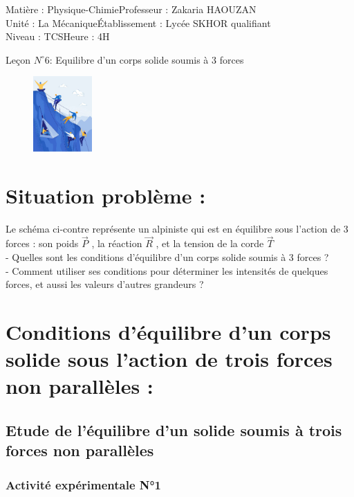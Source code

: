 \documentclass[12pt]{article}
\author{Zakaria HAOUZAN}
\date{\today}
\newcommand\headerMe[2]{\noindent{}#1\hfill#2}
\begin{document}
\headerMe{Matière : Physique-Chimie}{Professeur : Zakaria HAOUZAN}\\
\headerMe{Unité : La Mécanique}{Établissement : Lycée SKHOR qualifiant}\\
\headerMe{Niveau : TCS}{Heure : 4H}\\

\begin{center}
    \Large{Leçon $N^{\circ}6$: \color{red} Equilibre d’un corps solide soumis à 3 forces }
\end{center}

\begin{figure}
\includegraphics[width=0.2\textwidth]{./img/img00.jpg}
\end{figure}


\section{Situation problème : }
Le schéma ci-contre représente un alpiniste qui est en équilibre sous
l’action de 3 forces : son poids $\vec{P}$ , la réaction $\vec{R}$ , et la tension de la
corde $\vec{T}$
\\ - Quelles sont les conditions d’équilibre d’un corps solide
soumis à 3 forces ?
\\ - Comment utiliser ses conditions pour déterminer les intensités
de quelques forces, et aussi les valeurs d’autres grandeurs ?



\section{Conditions d’équilibre d'un corps solide sous l'action de trois forces non parallèles : }
\subsection{ Etude de l’équilibre d’un solide soumis à trois forces non parallèles  }
\subsubsection{Activité expérimentale N°1 }
 
\end{document}
